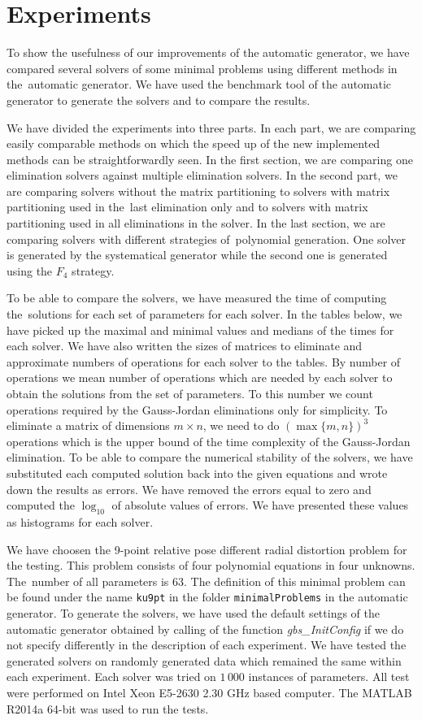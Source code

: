 \chapter{Experiments}
To show the usefulness of our improvements of the automatic generator, we have compared several solvers of some minimal problems using different methods in the~automatic generator. We have used the benchmark tool of the automatic generator to generate the solvers and to compare the results.

We have divided the experiments into three parts. In each part, we are comparing easily comparable methods on which the speed up of the new implemented methods can be straightforwardly seen. In the first section, we are comparing one elimination solvers against multiple elimination solvers. In the second part, we are comparing solvers without the matrix partitioning to solvers with matrix partitioning used in the~last elimination only and to solvers with matrix partitioning used in all eliminations in the solver. In the last section, we are comparing solvers with different strategies of~polynomial generation. One solver is generated by the systematical generator while the second one is generated using the $F_4$ strategy.

To be able to compare the solvers, we have measured the time of computing the~solutions for each set of parameters for each solver. In the tables below, we have picked up the maximal and minimal values and medians of the times for each solver. We have also written the sizes of matrices to eliminate and approximate numbers of operations for each solver to the tables. By number of operations we mean number of operations which are needed by each solver to obtain the solutions from the set of parameters. To this number we count operations required by the Gauss-Jordan eliminations only for simplicity. To eliminate a matrix of dimensions $m \times n$, we need to do $(\max\{m, n\})^3$ operations which is the upper bound of the time complexity of the Gauss-Jordan elimination. To be able to compare the numerical stability of the solvers, we have substituted each computed solution back into the given equations and wrote down the results as errors. We have removed the errors equal to zero and computed the $\log_{10}$ of absolute values of errors. We have presented these values as histograms for each solver.

We have choosen the 9-point relative pose different radial distortion problem \cite{9pt} for the testing. This problem consists of four polynomial equations in four unknowns. The~number of all parameters is 63. The definition of this minimal problem can be found under the name \texttt{ku9pt} in the folder \texttt{minimalProblems} in the automatic generator. To generate the solvers, we have used the default settings of the automatic generator obtained by calling of the function \textit{gbs\_InitConfig} if we do not specify differently in the description of each experiment. We have tested the generated solvers on randomly generated data which remained the same within each experiment. Each solver was tried on $1\,000$ instances of parameters. All test were performed on Intel Xeon E5-2630 2.30 GHz based computer. The MATLAB R2014a 64-bit was used to run the tests.

